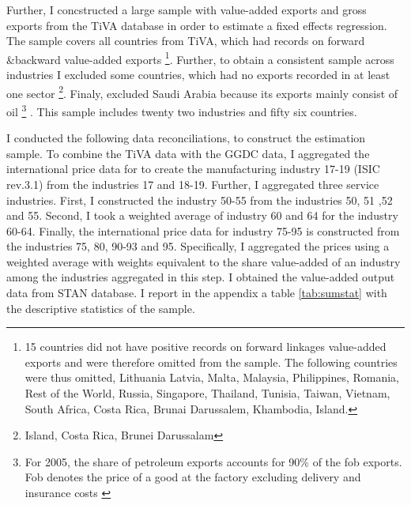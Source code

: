 Further, I concstructed a large sample with value-added exports and gross exports from the TiVA database in order to estimate a fixed effects regression.
The sample covers all countries from TiVA, which had records on forward \&backward value-added exports \footnote{15 countries did not have positive records on forward linkages value-added exports and were therefore omitted from the sample.
The following countries were thus omitted, Lithuania Latvia, Malta, Malaysia, Philippines, Romania, Rest of the World, Russia, Singapore, Thailand, Tunisia, Taiwan, Vietnam, South Africa, Costa Rica, Brunai Darussalem, Khambodia, Island.}.
Further, to obtain a consistent sample across industries I excluded some countries, which had no exports recorded in at least one sector \footnote{ Island, Costa Rica, Brunei Darussalam}. %
Finaly, excluded Saudi Arabia because its exports mainly consist of oil \footnote{ For 2005, the share of petroleum exports accounts for  90\% of the fob exports. Fob denotes the price of a good at the factory excluding delivery and insurance costs \parencite[p.78]{combes}} \parencite{opec}.
This sample includes twenty two industries and fifty six countries.
\par
I conducted the following data reconciliations, to construct the  estimation sample.
To combine the TiVA data with the GGDC data, I aggregated the international price data for to create the manufacturing industry 17-19 (ISIC rev.3.1) from the industries 17 and 18-19.
Further, I aggregated three service industries.
First, I constructed the industry 50-55 from the industries 50, 51 ,52 and 55.
Second, I took a weighted average  of industry 60 and 64 for the industry 60-64.
Finally, the international price data for industry 75-95 is constructed from the industries 75, 80, 90-93 and 95.
Specifically, I aggregated  the prices using a weighted average with weights equivalent to the share value-added of an industry among the industries aggregated in this step.
I obtained the value-added output data from  \textcite{OECDSTAN} STAN database.
I report in the appendix a table \ref{tab:sumstat} with the descriptive statistics of the sample.
\endinput
